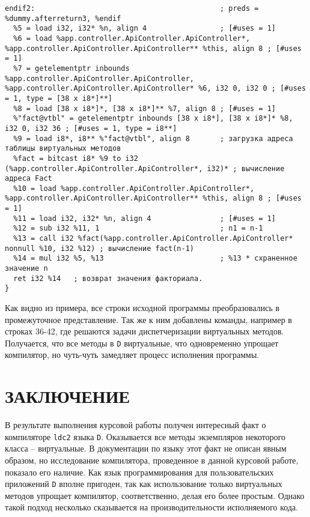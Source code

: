 \documentclass{studrep}
\begin{document}
\begin{verbatim}
endif2:                                           ; preds = %dummy.afterreturn3, %endif
  %5 = load i32, i32* %n, align 4                 ; [#uses = 1]
  %6 = load %app.controller.ApiController.ApiController*, %app.controller.ApiController.ApiController** %this, align 8 ; [#uses = 1]
  %7 = getelementptr inbounds %app.controller.ApiController.ApiController, %app.controller.ApiController.ApiController* %6, i32 0, i32 0 ; [#uses = 1, type = [38 x i8*]**]
  %8 = load [38 x i8*]*, [38 x i8*]** %7, align 8 ; [#uses = 1]
  %"fact@vtbl" = getelementptr inbounds [38 x i8*], [38 x i8*]* %8, i32 0, i32 36 ; [#uses = 1, type = i8**]
  %9 = load i8*, i8** %"fact@vtbl", align 8       ; загрузка адреса таблицы виртуальных методов
  %fact = bitcast i8* %9 to i32 (%app.controller.ApiController.ApiController*, i32)* ; вычисление адреса Fact
  %10 = load %app.controller.ApiController.ApiController*, %app.controller.ApiController.ApiController** %this, align 8 ; [#uses = 1]
  %11 = load i32, i32* %n, align 4                ; [#uses = 1]
  %12 = sub i32 %11, 1                            ; n1 = n-1
  %13 = call i32 %fact(%app.controller.ApiController.ApiController* nonnull %10, i32 %12) ; вычисление fact(n-1)
  %14 = mul i32 %5, %13                           ; %13 * схраненное значение n
  ret i32 %14   ; возврат значения факториала.
}
\end{verbatim}

Как видно из примера, все строки исходной программы преобразовались в промежуточное представление.  Так же к ним добавлены команды, например в строках 36-42, где решаются задачи диспетчеризации виртуальных методов.  Получается, что все методы в \verb|D| виртуальные, что одновременно упрощает компилятор, но чуть-чуть замедляет процесс исполнения программы.

\chapter*{ЗАКЛЮЧЕНИЕ}

В результате выполнения курсовой работы получен интересный факт о компиляторе \verb|ldc2| языка \verb|D|.  Оказывается все методы экземпляров некоторого класса -- виртуальные.  В документации по языку этот факт не описан явным образом, но исследование компилятора, проведенное в данной курсовой работе, показало его наличие.  Как язык программирования для пользовательских приложений \verb|D| вполне пригоден, так как использование только виртуальных методов упрощает компилятор, соответственно, делая его более простым. Однако такой подход несколько сказывается на производительности исполняемого кода.
\end{document}
